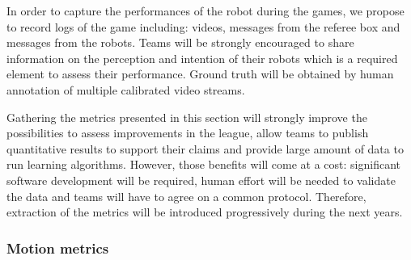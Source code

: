 \documentclass{article}
\begin{document}
In order to capture the performances of the robot during the games, we propose
to record logs of the game including: videos, messages from the referee box and
messages from the robots.
Teams will be strongly encouraged to share information on the perception and
intention of their robots which is a required element to assess their performance.
Ground truth will be obtained by human annotation of multiple calibrated video streams.

Gathering the metrics presented in this section will strongly improve the
possibilities to assess improvements in the league, allow teams to publish
quantitative results to support their claims and provide large amount of data
to run learning algorithms.
However, those benefits will come at a cost:
significant software development will be required,
human effort will be needed to validate the data and teams will have to agree on
a common protocol.
Therefore, extraction of the metrics will be introduced progressively during the
next years.


\subsubsection{Motion metrics}
\end{document}
